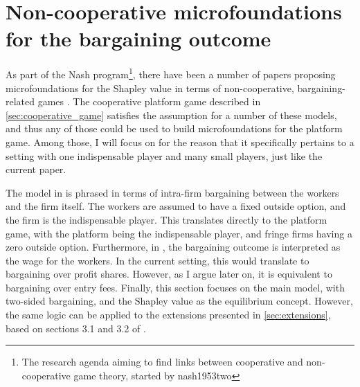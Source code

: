 \documentclass[a4paper]{article}
\begin{document}
\section{Non-cooperative microfoundations for the bargaining outcome}
\label{sec:bargaining_microfoundation}

As part of the Nash program\footnote{
    The research agenda aiming to find links between cooperative and non-cooperative game theory, started by nash1953two
}, there have been a number of papers proposing microfoundations for the Shapley value in terms of non-cooperative, bargaining-related games \parencite[e.g.][]{gul1989bargaining,winter1994demand,hart1996bargaining,stole1996intra}.
The cooperative platform game described in \cref{sec:cooperative_game} satisfies the assumption for a number of these models, and thus any of those could be used to build microfoundations for the platform game.
Among those, I will focus on \textcite{stole1996intra} for the reason that it specifically pertains to a setting with one indispensable player and many small players, just like the current paper.

The model in \textcite{stole1996intra} is phrased in terms of intra-firm bargaining between the workers and the firm itself.
The workers are assumed to have a fixed outside option, and the firm is the indispensable player.
This translates directly to the platform game, with the platform being the indispensable player, and fringe firms having a zero outside option.
Furthermore, in \textcite{stole1996intra}, the bargaining outcome is interpreted as the wage for the workers.
In the current setting, this would translate to bargaining over profit shares.
However, as I argue later on, it is equivalent to bargaining over entry fees.
Finally, this section focuses on the main model, with two-sided bargaining, and the Shapley value as the equilibrium concept.
However, the same logic can be applied to the extensions presented in \cref{sec:extensions}, based on sections 3.1 and 3.2 of \textcite{stole1996intra}.
\end{document}
